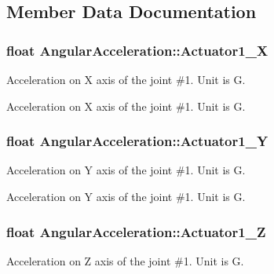 \subsection{Member Data Documentation}
\subsubsection[{\texorpdfstring{Actuator1\+\_\+X}{Actuator1_X}}]{\setlength{\rightskip}{0pt plus 5cm}float Angular\+Acceleration\+::\+Actuator1\+\_\+X}\hypertarget{struct_angular_acceleration_a5cfc56b69d136bce62b14f2828db3850}{}\label{struct_angular_acceleration_a5cfc56b69d136bce62b14f2828db3850}


Acceleration on X axis of the joint \#1. Unit is G. 

Acceleration on X axis of the joint \#1. Unit is G. 
\subsubsection[{\texorpdfstring{Actuator1\+\_\+Y}{Actuator1_Y}}]{\setlength{\rightskip}{0pt plus 5cm}float Angular\+Acceleration\+::\+Actuator1\+\_\+Y}\hypertarget{struct_angular_acceleration_ae7137ba81e19e031606c67f9f675ebf4}{}\label{struct_angular_acceleration_ae7137ba81e19e031606c67f9f675ebf4}


Acceleration on Y axis of the joint \#1. Unit is G. 

Acceleration on Y axis of the joint \#1. Unit is G. 
\subsubsection[{\texorpdfstring{Actuator1\+\_\+Z}{Actuator1_Z}}]{\setlength{\rightskip}{0pt plus 5cm}float Angular\+Acceleration\+::\+Actuator1\+\_\+Z}\hypertarget{struct_angular_acceleration_aae297625ad8f8f25a8e6ff44331ad369}{}\label{struct_angular_acceleration_aae297625ad8f8f25a8e6ff44331ad369}


Acceleration on Z axis of the joint \#1. Unit is G. 

